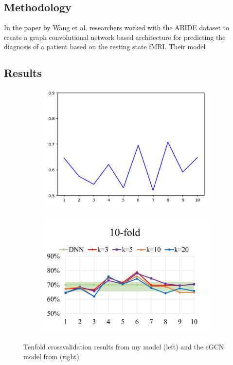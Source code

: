 	\subsection{Methodology}
	In the paper \cite{wang2021graph} by Wang et al. researchers worked with the ABIDE dataset to create a graph convolutional network based architecture for predicting the diagnosis of a patient based on the resting state fMRI. Their model 
	
	
	
	\subsection{Results}
	
	\begin{figure}[!h]
		\centering
		\begin{subfigure}[b]{0.45\textwidth}
			\centering
			\includegraphics[width=\textwidth]{figures/onlab_results.png}
		\end{subfigure}
		\hfill
		\begin{subfigure}[b]{0.45\textwidth}
			\centering
			\includegraphics[width=\textwidth]{figures/paper_results.png}
		\end{subfigure}
		\caption{Tenfold crossvalidation results from my model (left) and the cGCN model from \cite{wang2021graph} (right)}
		\label{fig:onlab_results}
	\end{figure}


